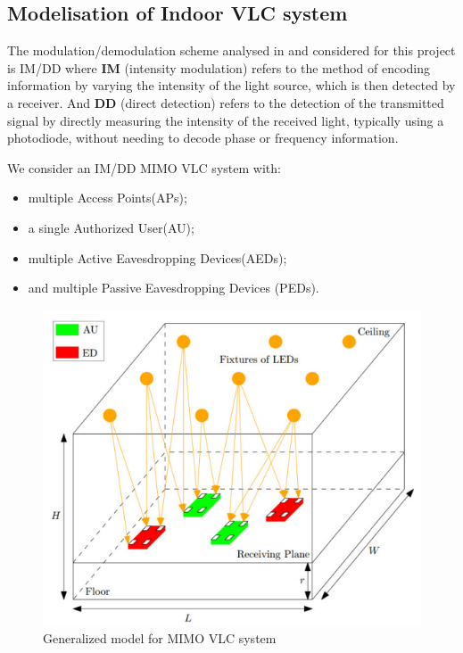 \documentclass[a4paper,12pt,twoside]{article}
\begin{document}
	\subsection{Modelisation of Indoor VLC system}
	
	The modulation/demodulation scheme analysed in \cite{Oxford2021} and considered for this project is IM/DD where \textbf{IM} (intensity modulation) refers to the method of encoding information by varying the intensity of the light source, which is then detected by a receiver. And \textbf{DD} (direct detection) refers to the detection of the transmitted signal by directly measuring the intensity of the received light, typically using a photodiode, without needing to decode phase or frequency information.
	
	We consider an IM/DD MIMO VLC system with:
	\begin{itemize}
		\item multiple Access Points(APs);
		\item a single Authorized User(AU);
		\item multiple Active Eavesdropping Devices(AEDs);
		\item and multiple Passive Eavesdropping Devices (PEDs).
	\end{itemize}
	
	\begin{figure}[h!]
		\centering
		\includegraphics[scale=0.5]{../modelisation.PNG}
		\caption{Generalized model for MIMO VLC system \cite{Edinburgh2020}}
	\end{figure}
	
\end{document}
